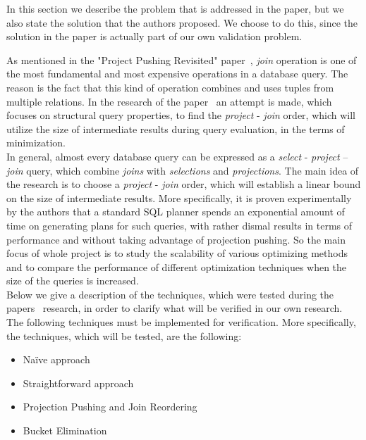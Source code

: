 In this section we describe the problem that is addressed in the paper, but we also state the solution that the authors proposed. We choose to do this, since the solution in the paper is actually part of our own validation problem.

As mentioned in the "Project Pushing Revisited" paper~\cite{paper}, \textit{join} operation is one of the most fundamental and most expensive operations in a database query. The reason is the fact that this kind of operation combines and uses tuples from multiple relations. In the research of the paper~\cite{paper} an attempt is made, which focuses on structural query properties, to find the \textit{project} - \textit{join} order, which will utilize the size of intermediate results during query evaluation, in the terms of minimization. \\

In general, almost every database query can be expressed as a \textit{select} - \textit{project} – \textit{join} query, which combine \textit{joins} with \textit{selections} and \textit{projections}. The main idea of the research is to choose a \textit{project} - \textit{join} order, which will establish a linear bound on the size of intermediate results. More specifically, it is proven experimentally by the authors that a standard SQL planner spends an exponential amount of time on generating plans for such queries, with rather dismal results in terms of performance and without taking advantage of projection pushing. So the main focus of whole project is to study the scalability of various optimizing methods and to compare the performance of different optimization techniques when the size of the queries is increased. \\

Below we give a description of the techniques, which were tested during the papers~\cite{paper} research, in order to clarify what will be verified in our own research. The following techniques must be implemented for verification. More specifically, the techniques, which will be tested, are the following:

\begin{itemize}
	\item Na\"ive approach
	\item Straightforward approach
	\item Projection Pushing and Join Reordering
	\item Bucket Elimination
\end{itemize}

